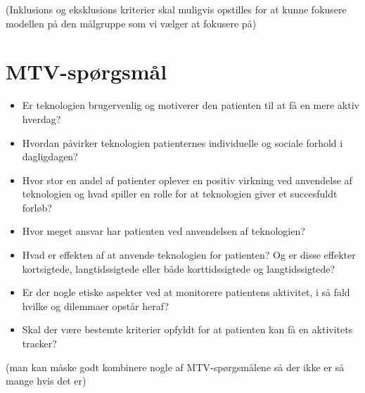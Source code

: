 (Inklusions og eksklusions kriterier skal muligvis opstilles for at kunne fokusere modellen på den målgruppe som vi vælger at fokusere på)


\section{MTV-spørgsmål}
\begin{itemize}
\item Er teknologien brugervenlig og motiverer den patienten til at få en mere aktiv hverdag?
\item Hvordan påvirker teknologien patienternes individuelle og sociale forhold i dagligdagen?
\item Hvor stor en andel af patienter oplever en positiv virkning ved anvendelse af teknologien og hvad spiller en rolle for at teknologien giver et succesfuldt forløb?
\item Hvor meget ansvar har patienten ved anvendelsen af teknologien?
\item Hvad er effekten af at anvende teknologien for patienten? Og er disse effekter kortsigtede, langtidssigtede eller både korttidssigtede og langtidssigtede?
\item Er der nogle etiske aspekter ved at monitorere patientens aktivitet, i så fald hvilke og dilemmaer opstår heraf?
\item Skal der være bestemte kriterier opfyldt for at patienten kan få en aktivitets tracker?
\end{itemize} 

(man kan måske godt kombinere nogle af MTV-spørgsmålene så der ikke er så mange hvis det er) 
